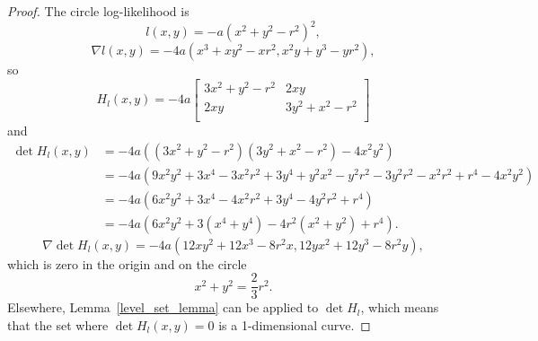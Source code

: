 \documentclass[english,twoside,openright]{HYgraduMLDS}
\begin{document}
\begin{appendices}
\begin{proof}
  The circle log-likelihood is
  \[
    l(x, y) = -a(x^{2} + y^{2} - r^{2})^{2},
  \]
  \[
    \nabla l(x, y) = -4a(x^{3} + xy^{2} - xr^{2}, x^{2}y + y^{3} - yr^{2}),
  \]
  so
  \[
    H_{l}(x, y) = -4a
    \begin{bmatrix}
      3x^{2} + y^{2} - r^{2} & 2xy \\
      2xy & 3y^{2} + x^{2} - r^{2} \\
    \end{bmatrix}
  \]
  and
  \begin{align*}
    \det H_{l}(x, y) &= -4a((3x^{2} + y^{2} - r^{2})(3y^{2} + x^{2} - r^{2})
                       - 4x^{2}y^{2})
    \\&= -4a(9x^{2}y^{2} + 3x^{4} - 3x^{2}r^{2} + 3y^{4} + y^{2}x^{2} -y^{2}r^{2}
    - 3y^{2}r^{2} - x^{2}r^{2} + r^{4} - 4x^{2}y^{2})
    \\&= -4a(6x^{2}y^{2} + 3x^{4} - 4x^{2}r^{2} + 3y^{4} - 4y^{2}r^{2} + r^{4})
    \\&= -4a(6x^{2}y^{2} + 3(x^{4} + y^{4}) - 4r^{2}(x^{2} + y^{2}) + r^{4}).
  \end{align*}
  \[
    \nabla \det H_{l}(x, y) = -4a(12xy^{2} + 12x^{3} - 8r^{2}x,
    12yx^{2} + 12y^{3} - 8r^{2}y),
  \]
  which is zero in the origin and on the circle
  \[
    x^{2} + y^{2} = \frac{2}{3}r^{2}.
  \]
  Elsewhere, Lemma~\ref{level_set_lemma} can be applied to \(\det H_{l}\), which
  means that the set where \(\det H_{l}(x, y) = 0\) is a 1-dimensional curve.
\end{proof}
\end{appendices}
\end{document}
